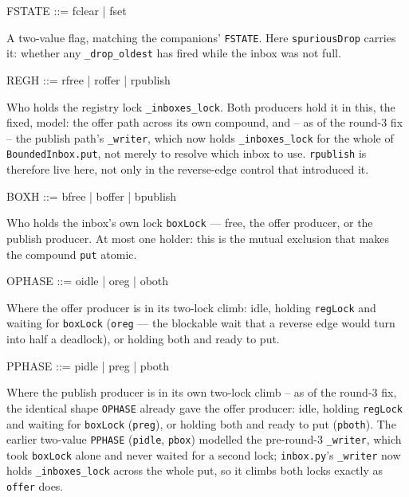 \documentclass[a4paper,10pt,fleqn]{article}
\begin{document}
\begin{zed}
  FSTATE ::= fclear | fset
\end{zed}

A two-value flag, matching the companions' \texttt{FSTATE}. Here \texttt{spuriousDrop}
carries it: whether any \texttt{\_drop\_oldest} has fired while the inbox was not
full.

\begin{zed}
  REGH ::= rfree | roffer | rpublish
\end{zed}

Who holds the registry lock \texttt{\_inboxes\_lock}. Both producers hold it in
this, the fixed, model: the offer path across its own compound, and -- as of
the round-3 fix -- the publish path's \texttt{\_writer}, which now holds
\texttt{\_inboxes\_lock} for the whole of \texttt{BoundedInbox.put}, not merely
to resolve which inbox to use. \texttt{rpublish} is therefore live here, not
only in the reverse-edge control that introduced it.

\begin{zed}
  BOXH ::= bfree | boffer | bpublish
\end{zed}

Who holds the inbox's own lock \texttt{boxLock} --- free, the offer producer, or
the publish producer. At most one holder: this is the mutual exclusion that makes
the compound \texttt{put} atomic.

\begin{zed}
  OPHASE ::= oidle | oreg | oboth
\end{zed}

Where the offer producer is in its two-lock climb: idle, holding
\texttt{regLock} and waiting for \texttt{boxLock} (\texttt{oreg} --- the blockable
wait that a reverse edge would turn into half a deadlock), or holding both and
ready to put.

\begin{zed}
  PPHASE ::= pidle | preg | pboth
\end{zed}

Where the publish producer is in its own two-lock climb -- as of the round-3
fix, the identical shape \texttt{OPHASE} already gave the offer producer:
idle, holding \texttt{regLock} and waiting for \texttt{boxLock}
(\texttt{preg}), or holding both and ready to put (\texttt{pboth}). The
earlier two-value \texttt{PPHASE} (\texttt{pidle}, \texttt{pbox}) modelled the
pre-round-3 \texttt{\_writer}, which took \texttt{boxLock} alone and never
waited for a second lock; \texttt{inbox.py}'s \texttt{\_writer} now holds
\texttt{\_inboxes\_lock} across the whole put, so it climbs both locks exactly
as \texttt{offer} does.
\end{document}
